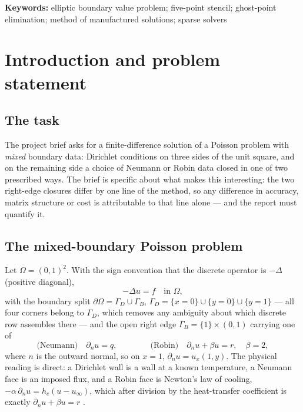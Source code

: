 \documentclass[11pt,a4paper]{article}
\begin{document}
\vspace{0.4cm}
\noindent\textbf{Keywords:} elliptic boundary value problem; five-point
stencil; ghost-point elimination; method of manufactured solutions; sparse
solvers

{\small
\setlength{\parskip}{0pt}
\tableofcontents}
\newpage

\section{Introduction and problem statement}
\label{sec:intro}

\subsection{The task}

The project brief asks for a finite-difference solution of a Poisson problem
with \emph{mixed} boundary data: Dirichlet conditions on three sides of the
unit square, and on the remaining side a choice of Neumann or Robin data
closed in one of two prescribed ways. The brief is specific about what makes
this interesting: the two right-edge closures differ by one line of the
method, so any difference in accuracy, matrix structure or cost is
attributable to that line alone --- and the report must quantify it.

\subsection{The mixed-boundary Poisson problem}
\label{sec:model}

Let $\Omega = (0,1)^2$. With the sign convention that the discrete operator
is $-\Delta$ (positive diagonal),
\begin{equation}\label{eq:pde}
-\Delta u = f \quad\text{in }\Omega,
\end{equation}
with the boundary split $\partial\Omega = \Gamma_D \cup \Gamma_B$,
$\Gamma_D = \{x=0\} \cup \{y=0\} \cup \{y=1\}$ --- all four corners belong to
$\Gamma_D$, which removes any ambiguity about which discrete row assembles
there --- and the open right edge $\Gamma_B = \{1\}\times(0,1)$ carrying one
of
\begin{equation}\label{eq:bc}
\text{(Neumann)}\quad \partial_n u = q,
\qquad\qquad
\text{(Robin)}\quad \partial_n u + \beta u = r,\quad \beta = 2,
\end{equation}
where $n$ is the outward normal, so on $x=1$, $\partial_n u = u_x(1,y)$.
The physical reading is direct: a Dirichlet wall is a wall at a known
temperature, a Neumann face is an imposed flux, and a Robin face is Newton's
law of cooling, $-\alpha\,\partial_n u = h_c(u-u_\infty)$, which after
division by the heat-transfer coefficient is exactly
$\partial_n u + \beta u = r$ \cite{leveque2007}.
\end{document}
